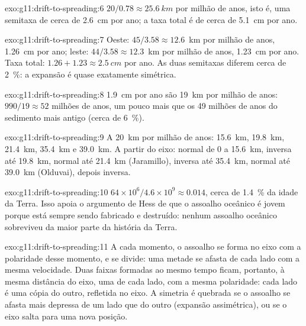 \begin{solution}{exo:g11:drift-to-spreading:6}
$20/0.78 \approx \qty{25.6}{km}$ por milhão de anos, isto é, uma semitaxa de
cerca de \qty{2.6}{cm} por ano; a taxa total é de cerca de \qty{5.1}{cm} por
ano.
\end{solution}

\begin{solution}{exo:g11:drift-to-spreading:7}
Oeste: $45/3.58 \approx 12.6$~km por milhão de anos, \qty{1.26}{cm} por ano;
leste: $44/3.58 \approx 12.3$~km por milhão de anos, \qty{1.23}{cm} por ano.
Taxa total: $1.26 + 1.23 \approx \qty{2.5}{cm}$ por ano. As duas semitaxas
diferem cerca de \qty{2}{\percent}: a expansão é quase exatamente simétrica.
\end{solution}

\begin{solution}{exo:g11:drift-to-spreading:8}
\qty{1.9}{cm} por ano são \qty{19}{km} por milhão de anos: $990/19 \approx 52$
milhões de anos, um pouco mais que os 49 milhões de anos do sedimento mais
antigo (cerca de \qty{6}{\percent}).
\end{solution}

\begin{solution}{exo:g11:drift-to-spreading:9}
A \qty{20}{km} por milhão de anos: \qty{15.6}{km}, \qty{19.8}{km},
\qty{21.4}{km}, \qty{35.4}{km} e \qty{39.0}{km}. A partir do eixo: normal de
0 a \qty{15.6}{km}, inversa até \qty{19.8}{km}, normal até \qty{21.4}{km}
(Jaramillo), inversa até \qty{35.4}{km}, normal até \qty{39.0}{km}
(Olduvai), depois inversa.
\end{solution}

\begin{solution}{exo:g11:drift-to-spreading:10}
$64 \times 10^6/4.6 \times 10^9 \approx \num{0.014}$, cerca de
\qty{1.4}{\percent} da idade da Terra. Isso apoia o argumento de Hess de que
o assoalho oceânico é jovem porque está sempre sendo fabricado e destruído:
nenhum assoalho oceânico sobreviveu da maior parte da história da Terra.
\end{solution}

\begin{solution}{exo:g11:drift-to-spreading:11}
A cada momento, o assoalho se forma no eixo com a polaridade desse momento,
e se divide: uma metade se afasta de cada lado com a mesma velocidade. Duas
faixas formadas ao mesmo tempo ficam, portanto, à mesma distância do eixo,
uma de cada lado, com a mesma polaridade: cada lado é uma cópia do outro,
refletida no eixo. A simetria é quebrada se o assoalho se afasta mais
depressa de um lado que do outro (expansão assimétrica), ou se o eixo salta
para uma nova posição.
\end{solution}

